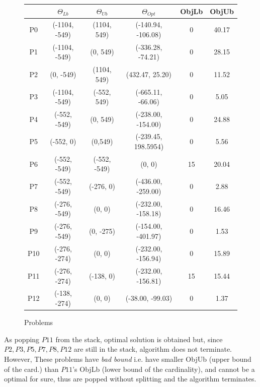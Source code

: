 \documentclass[paper=a4, fontsize=11pt]{scrartcl} %
\numberwithin{equation}{section} %
\numberwithin{figure}{section} %
\numberwithin{table}{section} %
\begin{document}
\begin{figure}[H]
        	\caption{Problems \label{tab:title}}
	\centering
        \begin{tabular}{ | c | c | c | c | c | c |}
        \hline
         	& $\Theta_{Lb}$ 	& $\Theta_{Ub}$ 	& $\Theta_{Opt}$ 	& ObjLb & ObjUb \\ 
        \hline
        P0 & (-1104, -549)		& (1104, 549)		& (-140.94, -106.08)	& 0 & 40.17\\ 
        \hline
        P1 & (-1104, -549)		& (0, 549)			& (-336.28, -74.21)	& 0 & 28.15 \\ 
        \hline
        P2 & (0, -549) 		& (1104, 549)		& (432.47, 25.20)	& 0 & 11.52\\
        \hline
        P3  & (-1104, -549)	& (-552, 549) 		& (-665.11, -66.06)	& 0 & 5.05\\
        \hline
        P4  & (-552, -549)		& (0, 549)			& (-238.00, -154.00)	& 0 & 24.88\\
        \hline
        P5   & (-552, 0) 		& (0,549)			& (-239.45, 198.5954)	& 0 & 5.56\\ 
        \hline
        P6   & (-552, -549) 	& (-552, -549)		& (0, 0) 			& 15 & 20.04\\ 
        \hline
        P7   & (-552, -549) 	& (-276, 0) 		& (-436.00, -259.00) & 0 & 2.88\\ 
        \hline
        P8   & (-276, -549) 	& (0, 0) 			& (-232.00, -158.18)	& 0 & 16.46\\ 
        \hline
        P9   & (-276, -549) 	& (0, -275)		& (-154.00, -401.97)	& 0 & 1.53\\ 
        \hline
        P10 & (-276, -274)		& (0, 0)			& (-232.00, -156.94)	& 0 & 15.89\\
        \hline
        P11 & (-276, -274)		& (-138, 0)		& (-232.00, -156.81)	& 15 & 15.44\\
        \hline 
        P12 & (-138, -274)		& (0, 0)			& (-38.00, -99.03)	& 0 & 1.37\\
        \hline
        \end{tabular}
\end{figure}

As popping $P11$ from the stack, optimal solution is obtained but, since $P2, P3, P5, P7, P8, P12$ are still in the stack, algorithm does not terminate. However, These problems have \textit{bad bound} i.e. have smaller ObjUb (upper bound of the card.) than $P11$'s ObjLb (lower bound of the cardinality), and cannot be a optimal for sure, thus are popped without splitting and the algorithm terminates.
\end{document}

